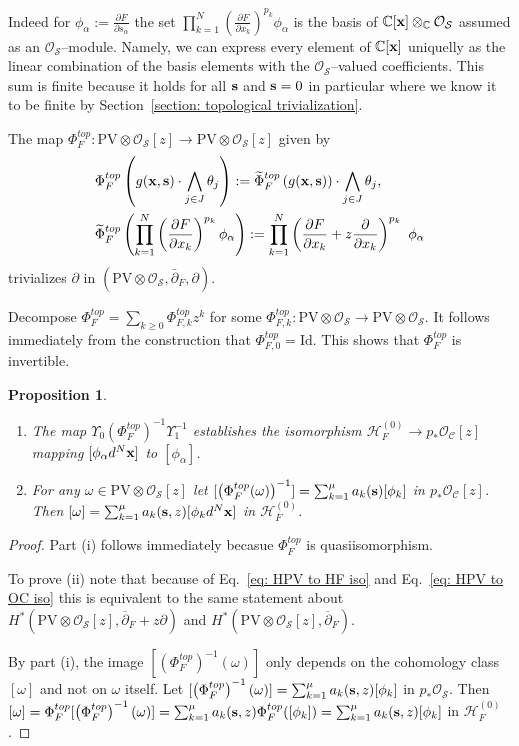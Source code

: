 \documentclass[12pt,a4paper]{amsart}
\newcommand{\CC}{{\mathbb{C}}}
\newcommand{\bx}{{\bf x}}
\def\C{{\mathcal C}}
\def\H{{\mathcal H}}
\def\O{{\mathcal O}}
\renewcommand{\S}{{\mathcal S}}
\newcommand{\p}{{\partial}}
\newcommand{\<}{\left<}
\renewcommand{\>}{\right>}
\newcommand{\bs}{{\bf s}}
\newcommand{\PV}{{\mathrm{PV}}}
\newtheorem{proposition}[theorem]{Proposition}
\numberwithin{equation}{section}
\begin{document}
Indeed for $\phi_\alpha := \frac{\p F}{\p s_\alpha}$ the set $\prod_{k=1}^N \left( \frac{\p F}{\p x_k} \right)^{p_k} \phi_\alpha$ is the basis of $\CC[\bx] \otimes_\CC \O_\S$ assumed as an $\O_\S$--module. Namely, we can express every element of $\CC[\bx]$ uniquelly as the linear combination of the basis elements with the $\O_\S$--valued coefficients. This sum is finite because it holds for all $\bs$ and $\bs = 0$ in particular where we know it to be finite by Section~\ref{section: topological trivialization}.

The map $\Phi^{top}_F: \PV \otimes \O_\S[z] \to \PV \otimes \O_\S[z]$ given by
\begin{align}
    & \Phi^{top}_F\left(g(\bx,\bs) \cdot \bigwedge_{j \in J} \theta_{j} \right)
    := \widetilde \Phi^{top}_F\left(g(\bx,\bs) \right) \cdot \bigwedge_{j \in J} \theta_{j},
    \\
    & \widetilde \Phi^{top}_F \left( \prod_{k=1}^N \left(\frac{\p F}{\p x_k} \right)^{p_k} \phi_\alpha \right) := \prod_{k=1}^N \left( \frac{\p F}{\p x_k} + z \frac{\p}{\p x_k} \right)^{p_k} \ \phi_\alpha
\end{align}
trivializes $\p$ in $(\PV \otimes \O_\S, \bar \p_F, \p)$.

Decompose $\Phi^{top}_F = \sum_{k \ge 0} \Phi^{top}_{F,k} z^k$ for some $\Phi^{top}_{F,k}: \PV\otimes\O_\S \to \PV\otimes\O_\S$. It follows immediately from the construction that $\Phi^{top}_{F,0} = \mathrm{Id}$. This shows that $\Phi^{top}_F$ is invertible.

\begin{proposition}\label{prop: tautology}~
    \begin{enumerate}
     \item[(i)] The map $\Upsilon_0\left( \Phi^{top}_F \right)^{-1} \Upsilon_1^{-1}$ establishes the isomorphism $\H_F^{(0)} \to p_\ast \O_\C[z]$ mapping $[\phi_\alpha d^N\bx]$ to $[\phi_\alpha]$.
     \item[(ii)] For any $\omega \in \PV\otimes\O_\S[z]$ let $[\left(\Phi^{top}_F(\omega)\right)^{-1}] = \sum_{k=1}^\mu a_k(\bs) [\phi_k]$ in $p_\ast \O_\C[z]$. Then $[\omega] = \sum_{k=1}^\mu a_k(\bs,z) [\phi_k d^N \bx]$ in $\H_F^{(0)}$.
    \end{enumerate}
\end{proposition}
\begin{proof}
    Part (i) follows immediately becasue $\Phi^{top}_F$ is quasiisomorphism.

    To prove (ii) note that because of Eq.~\eqref{eq: HPV to HF iso} and Eq.~\eqref{eq: HPV to OC iso} this is equivalent to the same statement about $H^*(\PV\otimes\O_\S[z],\overline\p_F + z \p)$ and $H^*(\PV\otimes\O_\S[z],\overline\p_F)$.

    By part (i), the image $[\left(\Phi^{top}_F\right)^{-1}(\omega)]$ only depends on the cohomology class $[\omega]$ and not on $\omega$ itself. Let $[\left(\Phi^{top}_F\right)^{-1}(\omega)] = \sum_{k=1}^\mu a_k(\bs,z) [\phi_k]$ in $p_*\O_\S$. Then $[\omega] = \Phi^{top}_F [\left(\Phi^{top}_F\right)^{-1}(\omega)] = \sum_{k=1}^\mu a_k(\bs,z) \Phi^{top}_F ( [\phi_k]) = \sum_{k=1}^\mu a_k(\bs,z) [\phi_k]$ in $\H_F^{(0)}$.
\end{proof}
\end{document}
